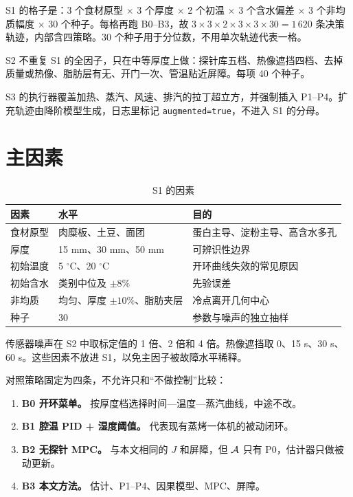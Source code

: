 S1 的格子是：3 个食材原型 $\times$ 3 个厚度 $\times$ 2 个初温 $\times$ 3 个含水偏差 $\times$ 3 个非均质幅度 $\times$ 30 个种子。每格再跑 B0--B3，故 $3\times3\times2\times3\times3\times30=1\,620$ 条决策轨迹，内部含四策略。30 个种子用于分位数，不用单次轨迹代表一格。

S2 不重复 S1 的全因子，只在中等厚度上做：探针库五档、热像遮挡四档、去掉质量或热像、脂肪层有无、开门一次、管温贴近屏障。每项 40 个种子。

S3 的执行器覆盖加热、蒸汽、风速、排汽的拉丁超立方，并强制插入 P1--P4。扩充轨迹由降阶模型生成，日志里标记 \texttt{augmented=true}，不进入 S1 的分母。

\section{主因素}

\begin{table}[H]
\centering
\caption{S1 的因素}
\begin{tabularx}{\textwidth}{llX}
\toprule
因素 & 水平 & 目的 \\
\midrule
食材原型 & 肉糜板、土豆、面团 & 蛋白主导、淀粉主导、高含水多孔 \\
厚度 & 15 mm、30 mm、50 mm & 可辨识性边界 \\
初始温度 & 5 $^\circ$C、20 $^\circ$C & 开环曲线失效的常见原因 \\
初始含水 & 类别中位及 $\pm 8\%$ & 先验误差 \\
非均质 & 均匀、厚度 $\pm 10\%$、脂肪夹层 & 冷点离开几何中心 \\
种子 & 30 & 参数与噪声的独立抽样 \\
\bottomrule
\end{tabularx}
\end{table}

传感器噪声在 S2 中取标定值的 1 倍、2 倍和 4 倍。热像遮挡取 0、15 s、30 s、60 s。这些因素不放进 S1，以免主因子被故障水平稀释。

对照策略固定为四条，不允许只和“不做控制”比较：

\begin{enumerate}
\item \textbf{B0 开环菜单。} 按厚度档选择时间—温度—蒸汽曲线，中途不改。
\item \textbf{B1 腔温 PID + 湿度阈值。} 代表现有蒸烤一体机的被动闭环。
\item \textbf{B2 无探针 MPC。} 与本文相同的 $J$ 和屏障，但 $\mathcal{A}$ 只有 P0，估计器只做被动更新。
\item \textbf{B3 本文方法。} 估计、P1--P4、因果模型、MPC、屏障。
\end{enumerate}

